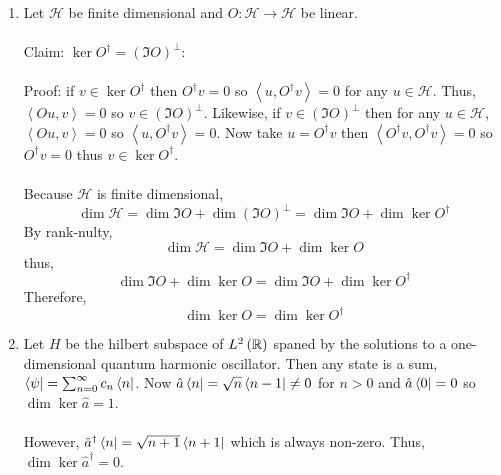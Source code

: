 \documentclass[12pt]{extarticle}
\begin{document}
\begin{enumerate}
\item Let $\mathcal{H}$ be finite dimensional and $O \! : \mathcal{H} \rightarrow \mathcal{H}$ be linear. \\ \\
Claim: $\ker{O^\dagger} = \left(\Im{O} \right)^{\perp}$: \\ \\
Proof: if $v \in \ker{O^\dagger}$ then $O^\dagger v = 0$ so $\left< u, O^\dagger v \right> = 0$ for any $u \in \mathcal{H}$. Thus, $\left< Ou, v \right> = 0$ so $v \in \left( \Im{O} \right)^{\perp}$. Likewise, if $v \in \left( \Im{O} \right)^{\perp}$ then for any $u \in \mathcal{H}$, $\left<Ou, v \right> = 0$ so $\left< u, O^\dagger v \right> = 0$. Now take $u = O^\dagger v$ then $\left< O^\dagger v, O^\dagger v \right> = 0$ so $O^\dagger v = 0$ thus $v \in \ker{O^\dagger}$. \\ \\
Because $\mathcal{H}$ is finite dimensional, \[\dim{\mathcal{H}} = \dim{\Im{O}} + \dim{\left( \Im{O} \right)^{\perp}} = \dim{\Im{O}} + \dim{\ker{O^\dagger}}\] By rank-nulty, \[\dim{\mathcal{H}} = \dim{\Im{O}} + \dim{\ker{O}}\] thus,\[\dim{\Im{O}} + \dim{\ker{O}} = \dim{\Im{O}} + \dim{\ker{O^\dagger}}\] Therefore, \[\dim{\ker{O}} = \dim{\ker{O^\dagger}}\]

\item Let $H$ be the hilbert subspace of $L^2 \left( \mathbb{R} \right)$ spaned by the solutions to a one-dimensional quantum harmonic oscillator. Then any state is a sum, $\left< \psi \right| =  \sum_{n = 0}^{\infty} c_n \left< n \right|$. Now $\hat{a} \left< n \right| = \sqrt{n} \left< n-1 \right| \neq 0$ for $n > 0$ and $\hat{a} \left< 0 \right| = 0$ so $\dim{\ker\hat{a} } = 1$. \\ \\ However, $\hat{a}^\dagger \left< n \right| = \sqrt{n+1}\left< n+1 \right|$ which is always non-zero. Thus, $\dim{\ker{\hat{a}^\dagger}} = 0$.


\end{enumerate}
\end{document}
